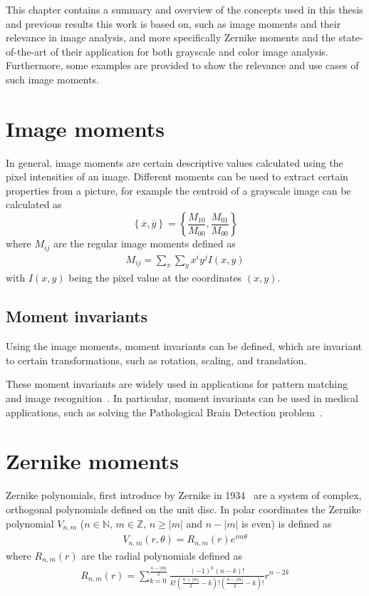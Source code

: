 This chapter contains a summary and overview of the concepts used in this thesis and previous results this work is based on, such as image moments and their relevance in image analysis, and more specifically Zernike moments and the state-of-the-art of their application for both grayscale and color image analysis. Furthermore, some examples are provided to show the relevance and use cases of such image moments.

\section{Image moments}
In general, image moments are certain descriptive values calculated using the pixel intensities of an image. Different moments can be used to extract certain properties from a picture, for example the centroid of a grayscale image can be calculated as
$$
\left\{ \overline{x}, \overline{y} \right\} = \left\{ \frac{M_{10}}{M_{00}},  \frac{M_{01}}{M_{00}} \right\}
$$ where $M_{ij}$ are the regular image moments defined as
\begin{gather}
M_{ij} =  \sum_x \sum_y x^i y^j I(x,y) \label{eq:regular_moment}
\end{gather} with $I(x,y)$ being the pixel value at the coordinates $(x,y)$.

\subsection{Moment invariants}
Using the image moments, moment invariants can be defined, which are invariant to certain transformations, such as rotation, scaling, and translation.

These moment invariants are widely used in applications for pattern matching and image recognition~\cite{app1, app2, app3}. In particular, moment invariants can be used in medical applications, such as solving the Pathological Brain Detection problem~\cite{med_app_1}.

\section{Zernike moments}
Zernike polynomials, first introduce by Zernike in 1934~\cite{zernike} are a system of complex, orthogonal polynomials defined on the unit disc. In polar coordinates the Zernike polynomial $V_{n,m}$ ($n \in \mathds{N}$, $m \in \mathds{Z}$, $n \geq |m|$ and $n - |m|$ is even) is defined as
\begin{gather*}
  V_{n,m}(r,\theta) = R_{n,m}(r) e^{i m\theta}
\end{gather*}
where $ R_{n,m}(r) $ are the radial polynomials defined as
\begin{gather}
  R_{n,m}(r) = \sum_{k=0}^{\frac{n - |m|}{2}}\frac{(-1)^k (n - k)!}{k!\left(\frac{n + |m|}{2} - k\right)!\left(\frac{n - |m|}{2} - k\right)!}r^{n-2k} \label{eq:radial_poly}
\end{gather}


